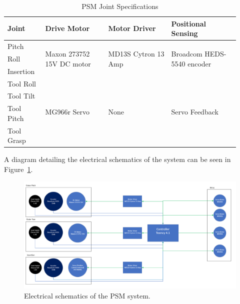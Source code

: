\begin{table}[htb!]
    \centering
    \caption{PSM Joint Specifications} %
    \label{tab:psm_specs} %
    \begin{tabular}{|p{0.15\linewidth}|p{0.25\linewidth}|p{0.25\linewidth}|p{0.27\linewidth}|}
        \hline
        \textbf{Joint} & \textbf{Drive Motor} & \textbf{Motor Driver} & \textbf{Positional Sensing} \\
        \hline
        Pitch & \multirow{3}{=}{\centering Maxon 273752 15V DC motor} & \multirow{3}{=}{\centering MD13S Cytron 13 Amp} & \multirow{3}{=}{\centering Broadcom HEDS-5540 encoder} \\
        Roll & & & \\
        Insertion & & & \\
        \hline
        Tool Roll & \multirow{4}{=}{\centering MG966r Servo} & \multirow{4}{=}{\centering None} & \multirow{4}{=}{\centering Servo Feedback} \\
        Tool Tilt & & & \\
        Tool Pitch & & & \\
        Tool Grasp & & & \\
        \hline
    \end{tabular}
\end{table}

A diagram detailing the electrical schematics of the system can be seen in Figure~\ref{fig:psm_electrical_schematics}.

\begin{figure}[htb!] %
    \centering
    \includegraphics[width=0.85\linewidth]{figures/PSM_electrical.png}
    \caption{Electrical schematics of the PSM system. \cite{walder2022design} }
    \label{fig:psm_electrical_schematics} %
\end{figure}

